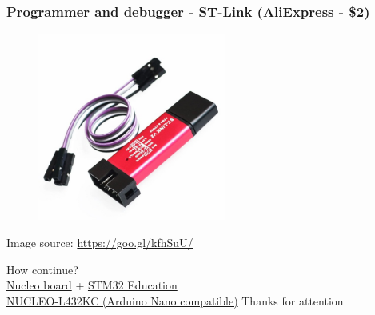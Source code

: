 \documentclass[12;pt,t]{beamer} %
\newcommand{\srctext}[1]{{\fontsize{7}{9}\selectfont\textcolor{sourcesclr}{#1}}}
\begin{document}
\begin{frame}
\frametitle{Programmer and debugger - ST-Link (AliExpress - \$2)}
	\begin{figure}[H]
		\includegraphics[width=0.55\textwidth]{img/Honeyview_ST-Link-V2.jpg}
	\end{figure}
	\srctext{Image source: \url{https://goo.gl/kfhSuU/}}
\end{frame}


\begin{frame}[fragile]
	\begin{center}
	\vfill
		How continue? \\
		
		\href{http://www.st.com/en/evaluation-tools/stm32-mcu-nucleo.html?querycriteria=productId=LN1847}{Nucleo board} + \href{http://www.st.com/content/st_com/en/support/learning/stm32-education.html}{STM32 Education} 
		\\
		
		{\tiny 
		\href{http://www.st.com/content/st_com/en/products/evaluation-tools/product-evaluation-tools/mcu-eval-tools/stm32-mcu-eval-tools/stm32-mcu-nucleo/nucleo-l432kc.html}{NUCLEO-L432KC (Arduino Nano compatible)}
	}
	\vfill
	    {\huge Thanks for attention}
	\end{center}
	\vfill
\end{frame}
\end{document}
